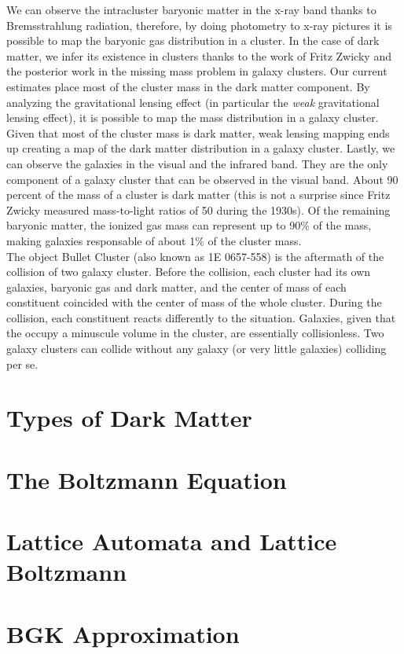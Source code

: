 We can observe the intracluster baryonic matter in the x-ray band thanks to Bremsstrahlung radiation, therefore, by doing photometry to x-ray pictures it is possible to map the baryonic gas distribution in a cluster.
In the case of dark matter, we infer its existence in clusters thanks to the work of Fritz Zwicky and the posterior work in the missing mass problem in galaxy clusters.
Our current estimates place most of the cluster mass in the dark matter component.
By analyzing the gravitational lensing effect (in particular the \emph{weak} gravitational lensing effect), it is possible to map the mass distribution in a galaxy cluster. 
Given that most of the cluster mass is dark matter, weak lensing mapping ends up creating a map of the dark matter distribution in a galaxy cluster.
Lastly, we can observe the galaxies in the visual and the infrared band.
They are the only component of a galaxy cluster that can be observed in the visual band.
About 90 percent of the mass of a cluster is dark matter (this is not a surprise since Fritz Zwicky measured mass-to-light ratios of 50 during the 1930s). Of the remaining baryonic matter, the ionized gas mass can represent up to 90\% of the mass, making galaxies responsable of about 1\% of the cluster mass.\\


The object Bullet Cluster (also known as 1E 0657-558) is the aftermath of the collision of two galaxy cluster.
Before the collision, each cluster had its own galaxies, baryonic gas and dark matter, and the center of mass of each constituent coincided with the center of mass of the whole cluster.
During the collision, each constituent reacts differently to the situation.
Galaxies, given that the occupy a minuscule volume in the cluster, are essentially collisionless. Two galaxy clusters can collide without any galaxy (or very little galaxies) colliding per se.\\






\section{Types of Dark Matter}

\section{The Boltzmann Equation}

\section{Lattice Automata and Lattice Boltzmann}

\section{BGK Approximation}
\label{bgk}
